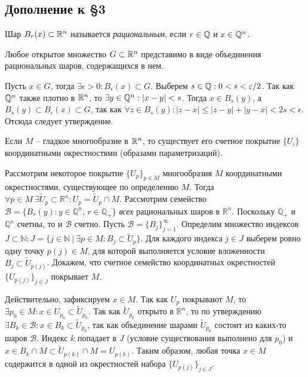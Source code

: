 \subsection{Дополнение к \S 3}

\begin{definition}
	Шар $B_r(x) \subset \mathbb{R}^n$ называется \textit{рациональным}, если $r \in \mathbb{Q}$ и $x \in \mathbb{Q}^n$.
\end{definition}

\begin{proposition}
	Любое открытое множество $G \subset \mathbb{R}^n$ представимо в виде объединения рациональных шаров, содержащихся в нем.
\end{proposition}

\begin{myproof}
	Пусть $x \in G$, тогда $\exists \epsilon > 0 : B_{\epsilon}(x) \subset G$. 
	Выберем $s \in \mathbb{Q} : 0 < s < \varepsilon/2$. 
	Так как $\mathbb{Q}^n$ также плотно в $\mathbb{R}^n$, то $\exists y \in \mathbb{Q}^n : |x - y| < s$.
	Тогда $x \in B_s(y)$, а $B_s(y) \subset B_{\epsilon}(x) \subset G$, так как $\forall z \in B_s(y) : |z - x| \leq |z - y| + |y - x| < 2s < \epsilon$. 
	Отсюда следует утверждение.
\end{myproof}

\begin{lemma}
	Если $M$ -- гладкое многообразие в $\mathbb{R}^n$, то существует его счетное покрытие $\{U_i\}$ координатными окрестностями (образами параметризаций).
\end{lemma}

\begin{myproof}
Рассмотрим некоторое покрытие $\{U_p\}_{p \in M}$ многообразия $M$ координатными окрестностями, существующее по определению $M$.
Тогда $\forall p \in M \ \exists \widetilde{U}_p \subset \mathbb{R}^n : U_p = \widetilde{U}_p \cap M$.
Рассмотрим семейство $\mathcal{B} = \{ B_r(y) : y \in \mathbb{Q}^n, \, r \in \mathbb{Q}_+\}$ \textit{всех} рациональных шаров в $\mathbb{R}^n$.
Поскольку $\mathbb{Q}_+$ и $\mathbb{Q}^n$ счетны, то и $\mathcal{B}$ счетно. Пусть $\mathcal{B} = \{B_j\}_{j=1}^{\infty}$.
Определим множество индексов $J \subset \mathbb{N} : J = \{ j \in \mathbb{N} \ | \ \exists p \in M : B_j \subset \widetilde{U}_p \}$. 
Для каждого индекса $j \in J$ выберем ровно одну точку $p(j) \in M$, для которой выполняется условие вложенности $B_j \subset \widetilde{U}_{p(j)}$. 
Докажем, что счетное семейство координатных окрестностей $\{U_{p(j)}\}_{j \in J}$ покрывает $M$.

\vspace{5pt}
Действительно, зафиксируем $x \in M$.
Так как $U_p$ покрывают $M$, то $\exists p_0 \in M : x \in U_{p_0} \subset \widetilde{U}_{p_0}$.
Так как $\widetilde{U}_{p_0}$ открыто в $\mathbb{R}^n$, то по утверждению $\exists B_k \in \mathcal{B} : x \in B_k \subset \widetilde{U}_{p_0}$, так как объединение шарами $\widetilde{U}_{p_0}$ состоит из каких-то шаров $\mathcal{B}$.
Индекс $k$ попадает в $J$ (условие существования выполнено для $p_0$) и $x \in B_k \cap M \subset \widetilde{U}_{p(k)} \cap M = U_{p(k)}$.
Таким образом, любая точка $x \in M$ содержится в одной из окрестностей набора $\{U_{p(j)}\}_{j \in J}$.
\end{myproof}


